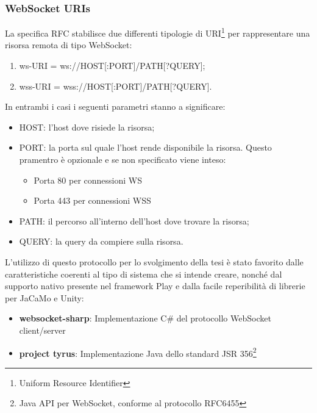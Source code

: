 \subsubsection{WebSocket URIs}

La specifica RFC \cite{RFC6455} stabilisce due differenti tipologie di URI\footnote{Uniform Resource Identifier} per rappresentare una risorsa remota di tipo WebSocket:

\begin{enumerate}
    \item ws-URI = ws://HOST[:PORT]/PATH[?QUERY];
    \item wss-URI = wss://HOST[:PORT]/PATH[?QUERY].
\end{enumerate}

In entrambi i casi i seguenti parametri stanno a significare:

\begin{itemize}
    \item HOST: l'host dove risiede la risorsa;
    \item PORT: la porta sul quale l'host rende disponibile la risorsa. Questo pramentro è opzionale e se non specificato viene inteso:
    \begin{itemize}
        \item Porta 80 per connessioni WS
        \item Porta 443 per connessioni WSS
    \end{itemize}
    \item PATH: il percorso all'interno dell'host dove trovare la risorsa;
    \item QUERY: la query da compiere sulla risorsa.
\end{itemize}


L'utilizzo di questo protocollo per lo svolgimento della tesi è stato favorito dalle caratteristiche coerenti al tipo di sistema che si intende creare, nonché dal supporto nativo presente nel framework Play e dalla facile reperibilità di librerie per JaCaMo e Unity:

\begin{itemize}
   \item \textbf{websocket-sharp}: Implementazione C\# del protocollo WebSocket client/server \cite{websocket-sharp}
   \item \textbf{project tyrus}: Implementazione Java dello standard JSR 356\footnote{Java API per WebSocket, conforme al protocollo RFC6455} \cite{tyrus}
\end{itemize}